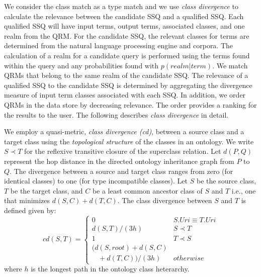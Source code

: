 We consider the class match as a type match and we use \emph{class divergence} to calculate the relevance between the candidate SSQ and a qualified SSQ. Each qualified SSQ will have input terms, output terms, associated classes, and one realm from the QRM.  For the candidate SSQ, the relevant classes for terms are determined from the natural language processing engine and corpora. The calculation of a realm for a candidate query is performed using the terms found within the query and any probabilities found with $p(realm|term)$. %
We match QRMs that belong to the same realm of the candidate SSQ. The relevance of a qualified SSQ to the candidate SSQ is determined by aggregating the divergence measure of input term classes associated with each SSQ. In addition, we order QRMs in the data store by decreasing relevance. The order provides a ranking for the results to the user. The following describes \emph{class divergence} in detail.


We employ a quasi-metric, \textit{class divergence (cd)}, between a source class and a target class using the \textit{topological structure} of the classes in an ontology. We write $S \prec T$ for the reflexive transitive closure of the superclass relation. Let $d(P,Q)$ represent the hop distance in the directed ontology inheritance graph from $P$ to $Q$. The divergence between a source and target class ranges from zero (for identical classes) to one (for type incompatible classes). Let $S$ be the source class, $T$ be the target class, and $C$ be a least common ancestor class of $S$ and $T$ i.e., one that minimizes $d(S,C) + d(T,C)$. The class divergence between $S$ and $T$ is defined given by:
\begin{equation}
cd(S, T) = \begin{cases}
0 & S.{Uri} \equiv T.{Uri}\\
d(S, T)/(3h) & S \prec T\\
1 & T \prec S\\
(d(S,root) + d(S,C) \\ \ \ \ \ + d(T,C))/(3h) & otherwise
\end{cases}
\end{equation}
where $h$ is the longest path in the ontology class heterarchy.

